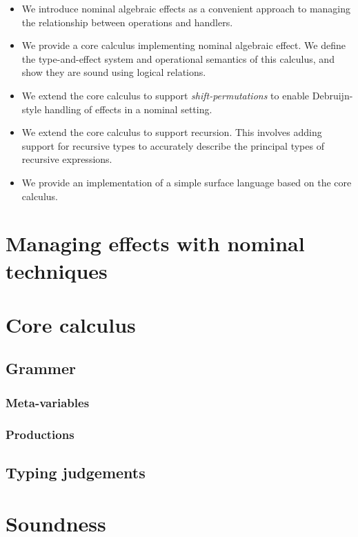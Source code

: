 \documentclass{article}
\begin{document}
\begin{itemize}
\item We introduce nominal algebraic effects as a convenient approach to
  managing the relationship between operations and handlers.
\item We provide a core calculus implementing nominal algebraic
  effect. We define the type-and-effect system and operational semantics
  of this calculus, and show they are sound using logical relations.
\item We extend the core calculus to support \emph{shift-permutations}
  to enable Debruijn-style handling of effects in a nominal setting.
\item We extend the core calculus to support recursion. This involves
  adding support for recursive types to accurately describe the
  principal types of recursive expressions.
\item We provide an implementation of a simple surface language based on
  the core calculus.
\end{itemize}

\section{Managing effects with nominal techniques}

\section{Core calculus}
\subsection{Grammer}
\subsubsection{Meta-variables}
\ottmetavars
\subsubsection{Productions}
\ottgrammar
\subsection{Typing judgements}
\ottdefnsKinding
\ottdefnsEquality
\ottdefnsSubtyping
\ottdefnsTyping
\section{Soundness}
\end{document}
